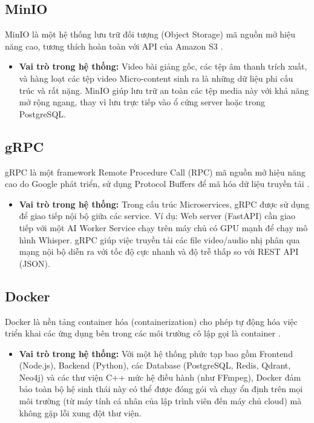 \subsection{MinIO}
MinIO là một hệ thống lưu trữ đối tượng (Object Storage) mã nguồn mở hiệu năng cao, tương thích hoàn toàn với API của Amazon S3 \cite{minio2024}.
\begin{itemize}
    \item \textbf{Vai trò trong hệ thống:} Video bài giảng gốc, các tệp âm thanh trích xuất, và hàng loạt các tệp video Micro-content sinh ra là những dữ liệu phi cấu trúc và rất nặng. MinIO giúp lưu trữ an toàn các tệp media này với khả năng mở rộng ngang, thay vì lưu trực tiếp vào ổ cứng server hoặc trong PostgreSQL.
\end{itemize}

\subsection{gRPC}
gRPC là một framework Remote Procedure Call (RPC) mã nguồn mở hiệu năng cao do Google phát triển, sử dụng Protocol Buffers để mã hóa dữ liệu truyền tải \cite{grpc2024}.
\begin{itemize}
    \item \textbf{Vai trò trong hệ thống:} Trong cấu trúc Microservices, gRPC được sử dụng để giao tiếp nội bộ giữa các service. Ví dụ: Web server (FastAPI) cần giao tiếp với một AI Worker Service chạy trên máy chủ có GPU mạnh để chạy mô hình Whisper. gRPC giúp việc truyền tải các file video/audio nhị phân qua mạng nội bộ diễn ra với tốc độ cực nhanh và độ trễ thấp so với REST API (JSON).
\end{itemize}

\subsection{Docker}
Docker là nền tảng container hóa (containerization) cho phép tự động hóa việc triển khai các ứng dụng bên trong các môi trường cô lập gọi là container \cite{merkel2014docker}.
\begin{itemize}
    \item \textbf{Vai trò trong hệ thống:} Với một hệ thống phức tạp bao gồm Frontend (Node.js), Backend (Python), các Database (PostgreSQL, Redis, Qdrant, Neo4j) và các thư viện C++ mức hệ điều hành (như FFmpeg), Docker đảm bảo toàn bộ hệ sinh thái này có thể được đóng gói và chạy ổn định trên mọi môi trường (từ máy tính cá nhân của lập trình viên đến máy chủ cloud) mà không gặp lỗi xung đột thư viện.
\end{itemize}
